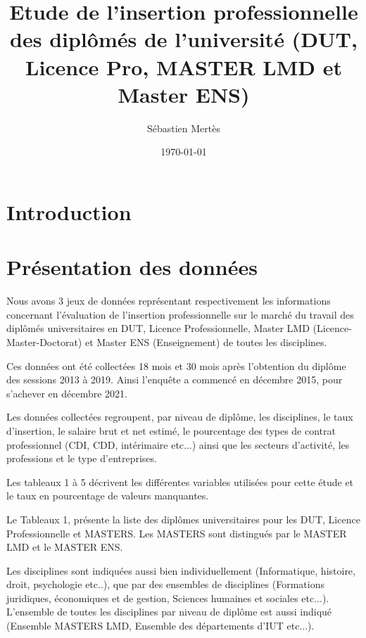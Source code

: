 \documentclass[12pt, a4paper, titlepage, table]{article}
\begin{document}
	\label{document}
	\title{Etude de l'insertion professionnelle des diplômés de l'université (DUT, Licence Pro, MASTER LMD et Master ENS)}
	\author{Sébastien Mertès}
	\date{\today}
	\maketitle
	\renewcommand{\thesection}{\arabic{section}.}
	\renewcommand{\thesubsection}{\thesection\arabic{subsection}}
	\renewcommand{\tablename}{Tableau}
	\renewcommand{\abstractname}{Résumé}
	\setlength{\parindent}{0pt}
	\captionsetup{labelfont=bf, font=small}
	\tableofcontents
	\newpage
	
\section{Introduction}
	
\section{Présentation des données}
	Nous avons 3 jeux de données représentant respectivement les informations concernant l'évaluation de l'insertion professionnelle sur le marché du travail des diplômés universitaires en DUT, Licence Professionnelle, Master LMD (Licence-Master-Doctorat) et Master ENS (Enseignement) de toutes les disciplines. 
	
	Ces données ont été collectées 18 mois et 30 mois après l'obtention du diplôme des sessions  2013 à 2019. Ainsi l'enquête a commencé en décembre 2015, pour s'achever en décembre 2021.
	
	Les données collectées regroupent, par niveau de diplôme, les disciplines, le taux d'insertion, le salaire brut et net estimé, le pourcentage des types de contrat professionnel (CDI, CDD, intérimaire etc...) ainsi que les secteurs d'activité, les professions et le type d'entreprises.
	
	Les tableaux 1 à 5 décrivent les différentes variables utilisées pour cette étude et le taux en pourcentage de valeurs manquantes.
	
	Le Tableaux 1, présente la liste des diplômes universitaires pour les DUT, Licence Professionnelle et MASTERS.
	Les MASTERS sont distingués par le MASTER LMD et le MASTER ENS. 
	
	Les disciplines sont indiquées aussi bien individuellement (Informatique, histoire, droit, psychologie etc..), que par des ensembles de disciplines (Formations juridiques, économiques et de gestion, Sciences humaines et sociales etc...). L'ensemble de toutes les disciplines par niveau de diplôme est aussi indiqué (Ensemble MASTERS LMD, Ensemble des départements d'IUT etc...).   
	
\end{document}
